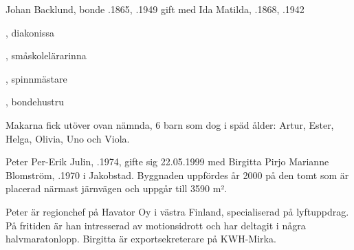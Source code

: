 Johan Backlund, bonde .1865, .1949 gift med Ida Matilda, .1868, .1942
\begin{jhchildren}
  \item {}, diakonissa
  \item {}, småskolelärarinna
  \item {}, spinnmästare
  \item {}, bondehustru
  \item {}
\end{jhchildren}
Makarna fick utöver ovan nämnda, 6 barn som dog i späd ålder: Artur, Ester, Helga, Olivia, Uno och Viola.


%



%
Peter Per-Erik Julin, .1974, gifte sig 22.05.1999 med Birgitta Pirjo Marianne Blomström, .1970 i Jakobstad. Byggnaden uppfördes år 2000 på den tomt som är placerad närmast järnvägen och uppgår till 3590 m².

Peter är regionchef på Havator Oy i västra Finland, specialiserad på lyftuppdrag. På fritiden är han intresserad av motionsidrott och har deltagit i några halvmaratonlopp. Birgitta är exportsekreterare på KWH-Mirka.
\begin{jhchildren}
  \item {}
  \item {}
\end{jhchildren}



%


